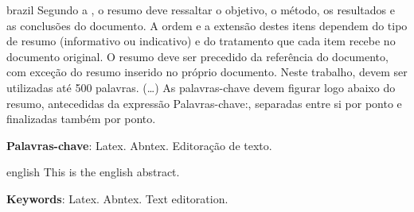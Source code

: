 \setlength{\absparsep}{18pt} %
\begin{resumo}[Resumo]
 \begin{otherlanguage*}{brazil}
    Segundo a , o resumo deve ressaltar o objetivo,
    o método, os resultados e as conclusões do documento. A ordem e a extensão destes
    itens dependem do tipo de resumo (informativo ou indicativo) e do tratamento que
    cada item recebe no documento original. O resumo deve ser precedido da referência
    do documento, com exceção do resumo inserido no próprio documento. Neste trabalho,
    devem ser utilizadas até 500 palavras. (\ldots) As palavras-chave devem figurar
    logo abaixo do resumo, antecedidas da expressão Palavras-chave:, separadas entre
    si por ponto e finalizadas também por ponto.

    \textbf{Palavras-chave}: Latex. Abntex. Editoração de texto.
 \end{otherlanguage*}
\end{resumo}
\begin{resumo}[Abstract]
 \begin{otherlanguage*}{english}
    This is the english abstract.
    
    \textbf{Keywords}: Latex. Abntex. Text editoration.
 \end{otherlanguage*}
\end{resumo}
